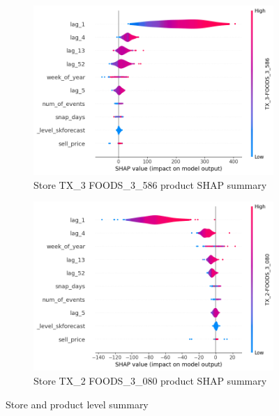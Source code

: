 \begin{figure}
\begin{subfigure}{.5\textwidth}
        \includegraphics[width=\linewidth,]{sections/img/store_product_violin3}
        \caption{Store TX\_3 FOODS\_3\_586 product SHAP summary}
        \label{fig:store_prod_sub3}
    \end{subfigure}%
    \begin{subfigure}{.5\textwidth}
        \centering
        \includegraphics[width=\linewidth]{sections/img/store_productviolin2}
        \caption{Store TX\_2 FOODS\_3\_080 product SHAP summary}
        \label{fig:store_prod_violin_sub4e}
    \end{subfigure}
    \caption{Store and product level summary}\label{fig:store_product_summary}
\end{figure}

